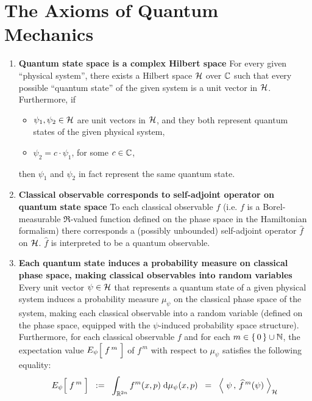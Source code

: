 

\section{The Axioms of Quantum Mechanics}
\setcounter{theorem}{0}
\setcounter{equation}{0}


\renewcommand{\theenumi}{\roman{enumi}}
\renewcommand{\labelenumi}{\textnormal{(\theenumi)}$\;\;$}


\begin{enumerate}
\item
	\textbf{Quantum state space is a complex Hilbert space}
	\vskip 0.05cm
	For every given ``physical system'', there exists a Hilbert space $\mathcal{H}$ over $\mathbb{C}$
	such that every possible ``quantum state'' of the given system is a unit vector in $\mathcal{H}$.
	Furthermore, if
	\begin{itemize}
	\item
		$\psi_{1}, \psi_{2} \in \mathcal{H}$ are unit vectors in $\mathcal{H}$, and they both represent quantum states of the given physical system,
	\item
		$\psi_{2} = c \cdot \psi_{1}$, for some $c \in \mathbb{C}$,
	\end{itemize}
	then $\psi_{1}$ and $\psi_{2}$ in fact represent the same quantum state.

\vskip 0.5cm
\item
	\textbf{Classical observable corresponds to self-adjoint operator on quantum state space}
	\vskip 0.05cm
	To each classical observable $f$
	(i.e. $f$ is a Borel-measurable $\Re$-valued function defined on the phase space in the Hamiltonian formalism)
	there corresponds a (possibly unbounded) self-adjoint operator
	$\widehat{f}$ on $\mathcal{H}$.
	$\widehat{f}$ is interpreted to be a quantum observable.

\vskip 0.5cm
\item
	\textbf{Each quantum state induces a probability measure on classical phase space, making classical observables into random variables}
	\vskip 0.05cm
	Every unit vector $\psi \in \mathcal{H}$ that represents a quantum state of a given physical system
	induces a probability measure $\mu_{\psi}$ on the classical phase space of the system,
	making each classical observable into a random variable
	(defined on the phase space, equipped with the $\psi$-induced probability space structure).
	Furthermore, for each classical observable $f$ and for each $m \in \{\,0\,\}\cup\mathbb{N}$,
	the expectation value $E_{\psi}\!\left[\;\overset{{\color{white}.}}{f^{\,m}}\;\right]$ of $f^{\,m}$
	with respect to $\mu_{\psi}$ satisfies the following equality:
	\begin{equation*}
	E_{\psi}\!\left[\;\overset{{\color{white}.}}{f^{\,m}}\;\right]
	\;\; := \;\;
		\int_{\Re^{2n}}
		f^{m}(x,p)
		\;\d\mu_{\psi}(x,p)
	\;\; = \;\;
		\left\langle\;
			\psi
			\,,\,
			\widehat{f}^{\,m}(\psi)
			\;\right\rangle_{\H}
	\end{equation*}


\end{enumerate}
